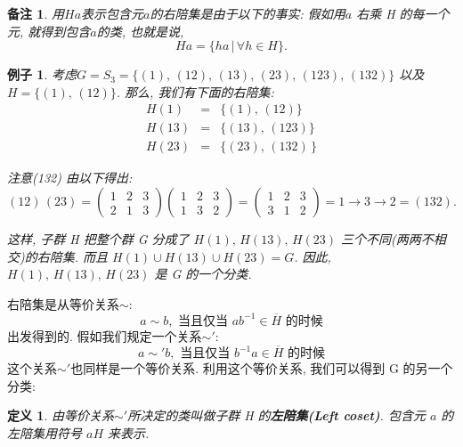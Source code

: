 \documentclass[utf8]{ctexbook}
\newtheorem{definition}{定义}[section]
\newtheorem{memo}{备注}[section]
\newtheorem{example}{例子}[section]
\begin{document}
\begin{memo}
用$Ha$表示包含元$a$的右陪集是由于以下的事实: 假如用$a$ 右乘 H 的每一个元, 就得到包含$a$的类, 也就是说, $$Ha= \{ ha \, | \, \forall h \in H \} .$$
\end{memo}

\begin{example}
考虑$G= S_3 = \{  (1), \, (12), \, (13), \, (23), \, (123), \, (132) \}$ 以及 $H = \{ (1), \, (12) \}$.
那么, 我们有下面的右陪集:
\begin{eqnarray*}
H(1) &=& \{ (1), \, (12) \} \\
H(13) &=& \{ (13), \, (123) \} \\
H(23) &=& \{ (23), \, (132) \, \} 
\end{eqnarray*}

{注意(132) 由以下得出: 
\begin{equation*}
(12) \, (23) =  \left( \begin{array}{ccc}
1 & 2 & 3 \\
2 & 1 & 3
\end{array}  \right) \left(
\begin{array}{ccc}
1 & 2 & 3 \\
1 & 3 & 2
\end{array}
\right) = \left(
\begin{array}{ccc}
1 & 2 & 3 \\
3 & 1 & 2
\end{array}
\right) = 1 \rightarrow 3 \rightarrow 2 = (132) .
\end{equation*}
}

这样, 子群 H 把整个群 G 分成了 $H(1), \, H(13), \, H(23)$ 三个不同(两两不相交)的右陪集. 而且 $H(1) \cup H(13) \cup H(23) = G$. 因此, $H(1), \, H(13), \, H(23)$ 是 G 的一个分类.

\end{example}

右陪集是从等价关系$\sim$:
\begin{equation}
a \sim b, \mbox{ 当且仅当 } a b^{-1} \in \overline{H} \mbox{  的时候}
\end{equation}
出发得到的. 假如我们规定一个关系$\sim'$:
\begin{equation}
a \sim' b, \mbox{ 当且仅当 } b^{-1} a \in \overline{H} \mbox{  的时候}
\end{equation}
这个关系$\sim'$也同样是一个等价关系. 利用这个等价关系, 我们可以得到 G 的另一个分类:
\begin{definition}
由等价关系$\sim'$所决定的类叫做子群 H 的\textbf{左陪集(Left coset)}. 包含元 $a$ 的左陪集用符号 $aH$ 来表示.
\end{definition}
\end{document}
